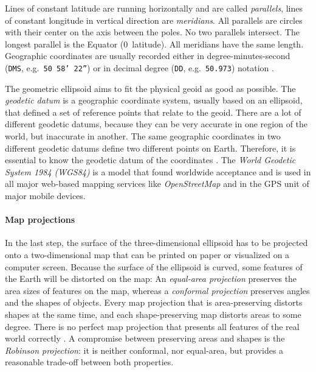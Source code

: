 Lines of constant latitude are running horizontally and are called \emph{parallels}, lines of constant longitude in vertical direction are \emph{meridians}. All parallels are circles with their center on the axis between the poles. No two parallels intersect. The longest parallel is the Equator (0\degree~latitude). All meridians have the same length. Geographic coordinates are usually recorded either in degree-minutes-second (\texttt{DMS}, e.g.\ \texttt{50\degree~58' 22''}) or in decimal degree (\texttt{DD}, e.g.\ \texttt{50.973}) notation
\cite[pp. 30, 79]{bolstad2008gis}.

The geometric ellipsoid aims to fit the physical geoid as good as possible. The \emph{geodetic datum} is a geographic coordinate system, usually based on an ellipsoid, that defined a set of reference points that relate to the geoid. There are a lot of different geodetic datums, because they can be very accurate in one region of the world, but inaccurate in another. The same geographic coordinates in two different geodetic datums define two different points on Earth. Therefore, it is essential to know the geodetic datum of the coordinates \cite[p. 80]{bolstad2008gis}.
The \emph{World Geodetic System 1984 (WGS84)} is a model that found worldwide acceptance and is used in all major web-based mapping services like \emph{OpenStreetMap} and in the GPS unit of major mobile devices.


\paragraph{Map projections} %
\label{par:map_projections}

In the last step, the surface of the three-dimensional ellipsoid has to be projected onto a two-dimensional map that can be printed on paper or visualized on a computer screen.
Because the surface of the ellipsoid is curved, some features of the Earth will be distorted on the map: An \emph{equal-area projection} preserves the area sizes of features on the map, whereas a \emph{conformal projection} preserves angles and the shapes of objects. Every map projection that is area-preserving distorts shapes at the same time, and each shape-preserving map distorts areas to some degree. There is no perfect map projection that presents all features of the real world correctly \cite{mapProjectionGeokov}.
A compromise between preserving areas and shapes is the \emph{Robinson projection}: it is neither conformal, nor equal-area, but provides a reasonable trade-off between both properties.


